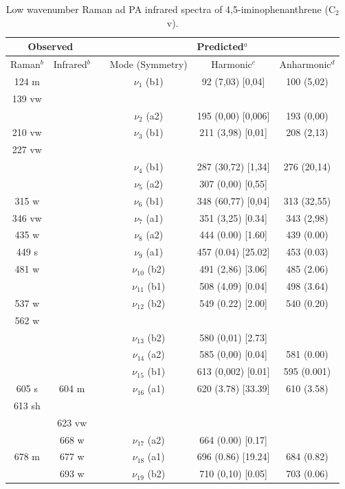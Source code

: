 	
		\begin{table}[H]
			\caption{Low wavenumber Raman ad PA infrared spectra of 4,5-iminophenanthrene (C$_{2}$v).}
			\begin{center}
				\begin{threeparttable}
					\begin{tabular}{c c c c c c}
						\hline
						\multicolumn{ 2}{c}{Observed} & \multicolumn{1}{c}{} & \multicolumn{ 3}{c}{Predicted$^{a}$} \\ \hline
						Raman$^{b}$ & \multicolumn{1}{c}{Infrared$^{b}$} &  & \multicolumn{1}{c}{Mode (Symmetry)} & \multicolumn{1}{c}{Harmonic$^{c}$} & Anharmonic$^{d}$ \\ \hline
	124 m &  &  & $\nu_{1}$ (b1) & 92 (7,03) [0,04] & 100 (5,02) \\ 
	139 vw &  &  &  &  &  \\ 
	&  &  & $\nu_{2}$ (a2) & 195 (0,00) [0,006] & 193 (0,00) \\ 
	210 vw &  &  & $\nu_{3}$ (b1) & 211 (3,98) [0,01] & 208 (2,13) \\ 
	227 vw &  &  &  &  &  \\ 
	&  &  & $\nu_{4}$ (b1) & 287 (30,72) [1,34] & 276 (20,14) \\
	&  &  & $\nu_{5}$ (a2) & 307 (0,00) [0,55] &  \\ 
	315 w &  &  & $\nu_{6}$ (b1) & 348 (60,77) [0,04] & 313 (32,55) \\
	346 vw &  &  & $\nu_{7}$ (a1) & 351 (3,25) [0.34] & 343 (2,98) \\
	435 w &  &  & $\nu_{8}$ (a2) & 444 (0.00) [1.60] & 439 (0.00) \\ 
	449 s &  &  & $\nu_{9}$ (a1) & 457 (0.04) [25.02] & 453 (0.03) \\ 
	481 w &  &  & $\nu_{10}$ (b2)& 491 (2,86) [3.06] & 485 (2.06) \\ 
	&  &  & $\nu_{11}$ (b1) & 508 (4,09) [0.04] & 498 (3.64) \\ 
	537 w &  &  & $\nu_{12}$ (b2) & 549 (0.22) [2.00] & 540 (0.20) \\ 
	562 w &  &  &  &  &  \\ 
	&  &  & $\nu_{13}$ (b2) & 580 (0,01) [2.73] &  \\ 
	&  &  & $\nu_{14}$ (a2) & 585 (0,00) [0.04] & 581 (0.00) \\
	&  &  & $\nu_{15}$ (b1) & 613 (0,002) [0.01] & 595 (0.001) \\ 
	605 s & 604 m &  & $\nu_{16}$ (a1) & 620 (3.78) [33.39] & 610 (3.58) \\ 
	613 sh &  &  &  &  &  \\
	& \multicolumn{1}{c}{623 vw} &  &  &  &  \\ 
	& \multicolumn{1}{c}{668 w} &  & $\nu_{17}$ (a2) & 664 (0.00) [0.17] &  \\
	678 m & \multicolumn{1}{c}{677 w} &  & $\nu_{18}$ (a1) & 696 (0.86) [19.24] & 684 (0.82) \\ 
	& \multicolumn{1}{c}{693 w} &  & $\nu_{19}$ (b2) & 710 (0,10) [0.05] & 703 (0.06) \\
	

\end{tabular}
\end{threeparttable}
\end{center}
\end{table}
